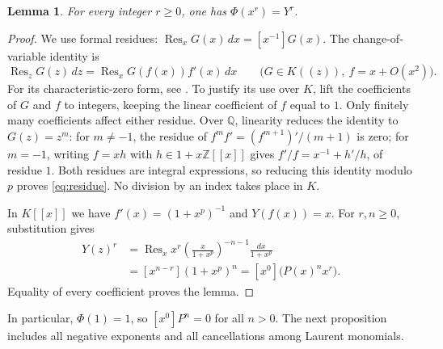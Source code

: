 \documentclass[11pt]{article}
\newtheorem{lemma}[theorem]{Lemma}
\theoremstyle{remark}
\DeclareMathOperator{\Res}{Res}
\begin{document}
\begin{lemma}\label{lem:monomial}
For every integer $r\geq0$, one has $\Phi(x^r)=Y^r$.
\end{lemma}
\begin{proof}
We use formal residues: $\Res_x G(x)\,dx=[x^{-1}]G(x)$.
The change-of-variable identity is
\begin{equation}\label{eq:residue}
 \Res_z G(z)\,dz=\Res_x G(f(x))f'(x)\,dx
 \qquad\bigl(G\in K((z)),\ f=x+O(x^2)\bigr).
\end{equation}
For its characteristic-zero form, see
\cite[Theorem~4.1.1]{Gessel2016}. To justify its use over $K$, lift the
coefficients of $G$ and $f$ to integers, keeping the linear coefficient of
$f$ equal to $1$. Only finitely many coefficients affect either residue.
Over $\mathbb Q$, linearity reduces the identity to
$G(z)=z^m$: for $m\ne-1$, the residue of
$f^m f'=(f^{m+1})'/(m+1)$ is zero; for $m=-1$, writing $f=xh$ with
$h\in1+x\mathbb Z[[x]]$ gives $f'/f=x^{-1}+h'/h$, of residue $1$.
Both residues are integral expressions, so reducing this identity modulo
$p$ proves \eqref{eq:residue}. No division by an index takes place in $K$.

In $K[[x]]$ we have $f'(x)=(1+x^p)^{-1}$ and $Y(f(x))=x$.
For $r,n\geq0$, substitution gives
\begin{align*}
 [z^n]Y(z)^r
 &=\Res_x x^r\left(\frac{x}{1+x^p}\right)^{-n-1}
                  \frac{dx}{1+x^p}\\
 &=[x^{n-r}](1+x^p)^n
  =[x^0]\bigl(P(x)^n x^r\bigr).
\end{align*}
Equality of every coefficient proves the lemma.
\end{proof}

In particular, $\Phi(1)=1$, so $[x^0]P^n=0$ for all $n>0$.
The next proposition includes all negative exponents and all cancellations
among Laurent monomials.
\end{document}
